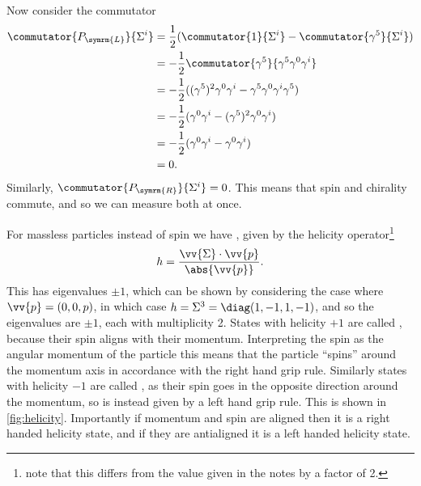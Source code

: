 \documentclass[fleqn]{NotesClass}
\newcommand{\Left}{\symrm{L}}
\newcommand{\Right}{\symrm{R}}
\begin{document}
    Now consider the commutator
    \begin{align}
        \commutator{P_{\Left}}{\Sigma^i} &= \frac{1}{2}(\commutator{1}{\Sigma^i} - \commutator{\gamma^5}{\Sigma^i})\\
        &= -\frac{1}{2}\commutator{\gamma^5}{\gamma^5\gamma^0\gamma^i}\\
        &= -\frac{1}{2}((\gamma^5)^2\gamma^0\gamma^i - \gamma^5\gamma^0\gamma^i\gamma^5)\\
        &= -\frac{1}{2}(\gamma^0\gamma^i - (\gamma^5)^2\gamma^0\gamma^i)\\
        &= -\frac{1}{2}(\gamma^0\gamma^i - \gamma^0\gamma^i)\\
        &= 0.
    \end{align}
    Similarly, \(\commutator{P_{\Right}}{\Sigma^i} = 0\).
    This means that spin and chirality commute, and so we can measure both at once.
    
    For massless particles instead of spin we have , given by the helicity operator\footnote{note that this differs from the value given in the notes by a factor of 2.}
    \begin{equation}
        h = \frac{\vv{\Sigma} \cdot \vv{p}}{\abs{\vv{p}}}.
    \end{equation}
    This has eigenvalues \(\pm 1\), which can be shown by considering the case where \(\vv{p} = (0, 0, p)\), in which case \(h = \Sigma^3 = \diag(1, -1, 1, -1)\), and so the eigenvalues are \(\pm 1\), each with multiplicity 2.
    States with helicity \(+1\) are called , because their spin aligns with their momentum.
    Interpreting the spin as the angular momentum of the particle this means that the particle \enquote{spins} around the momentum axis in accordance with the right hand grip rule.
    Similarly states with helicity \(-1\) are called , as their spin goes in the opposite direction around the momentum, so is instead given by a left hand grip rule.
    This is shown in \cref{fig:helicity}.
    Importantly if momentum and spin are aligned then it is a right handed helicity state, and if they are antialigned it is a left handed helicity state.
    
\end{document}
